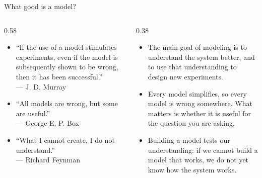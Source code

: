 \documentclass[aspectratio=169,10pt,t]{beamer}
\begin{document}
\begin{frame}{What good is a model?}
  \begin{columns}[T]
    \begin{column}{0.58\textwidth}
      \begin{itemize}
        \setlength\itemsep{3mm}
        \item<1-> ``If the use of a model stimulates experiments, even if the model is
              subsequently shown to be wrong, then it has been successful.''\\
              {\small\color{fsGray}--- J. D. Murray}
        \item<2-> ``All models are wrong, but some are useful.''\\
              {\small\color{fsGray}--- George E. P. Box}
        \item<3-> ``What I cannot create, I do not understand.''\\
              {\small\color{fsGray}--- Richard Feynman}
      \end{itemize}
    \end{column}
    \begin{column}{0.38\textwidth}
      \small
      \begin{itemize}
        \setlength\itemsep{3mm}
        \item<4-> The main goal of modeling is to understand the system better, and to use
              that understanding to design new experiments.
        \item<5-> Every model simplifies, so every model is wrong somewhere. What matters is
              whether it is useful for the question you are asking.
        \item<6-> Building a model tests our understanding: if we cannot build a model that
              works, we do not yet know how the system works.
      \end{itemize}
    \end{column}
  \end{columns}
\end{frame}
\end{document}
